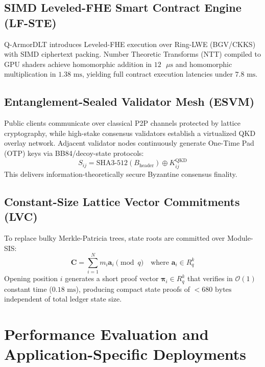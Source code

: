 \documentclass[runningheads]{llncs}
\begin{document}
\subsection{SIMD Leveled-FHE Smart Contract Engine (LF-STE)}
Q-ArmorDLT introduces Leveled-FHE execution over Ring-LWE (BGV/CKKS) with SIMD ciphertext packing. Number Theoretic Transforms (NTT) compiled to GPU shaders achieve homomorphic addition in $12\text{ }\mu\text{s}$ and homomorphic multiplication in $1.38\text{ ms}$, yielding full contract execution latencies under $7.8\text{ ms}$.

\subsection{Entanglement-Sealed Validator Mesh (ESVM)}
Public clients communicate over classical P2P channels protected by lattice cryptography, while high-stake consensus validators establish a virtualized QKD overlay network. Adjacent validator nodes continuously generate One-Time Pad (OTP) keys via BB84/decoy-state protocols:
\begin{equation}
    S_{ij} = \text{SHA3-512}(B_{\text{header}}) \oplus K_{ij}^{\text{QKD}}
\end{equation}
This delivers information-theoretically secure Byzantine consensus finality.

\subsection{Constant-Size Lattice Vector Commitments (LVC)}
To replace bulky Merkle-Patricia trees, state roots are committed over Module-SIS:
\begin{equation}
    \mathbf{C} = \sum_{i=1}^N m_i \mathbf{a}_i \pmod q \quad \text{where } \mathbf{a}_i \in R_q^k
\end{equation}
Opening position $i$ generates a short proof vector $\mathbf{\pi}_i \in R_q^k$ that verifies in $\mathcal{O}(1)$ constant time ($0.18\text{ ms}$), producing compact state proofs of $< 680\text{ bytes}$ independent of total ledger state size.

\section{Performance Evaluation and Application-Specific Deployments}
\end{document}
